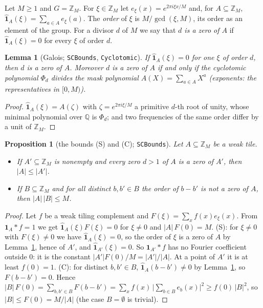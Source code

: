 \documentclass[11pt,a4paper]{amsart}
\newtheorem{proposition}[theorem]{Proposition}
\newtheorem{lemma}[theorem]{Lemma}
\theoremstyle{definition}
\theoremstyle{remark}
\newcommand{\Z}{\mathbb{Z}}
\newcommand{\Q}{\mathbb{Q}}
\newcommand{\one}{\mathbf{1}}
\newcommand{\lean}[1]{\texttt{#1}}
\begin{document}
Let $M\ge 1$ and $G=\Z_M$. For $\xi\in\Z_M$ let $e_\xi(x)=e^{2\pi i\xi x/M}$ and, for $A\subseteq\Z_M$,
$\hat{\one}_A(\xi)=\sum_{a\in A}e_\xi(a)$. The \emph{order} of $\xi$ is $M/\gcd(\xi,M)$, its order as an element
of the group. For a divisor $d$ of $M$ we say that \emph{$d$ is a zero of $A$} if $\hat{\one}_A(\xi)=0$ for
every $\xi$ of order $d$.

\begin{lemma}[Galois; \lean{SCBounds}, \lean{Cyclotomic}]\label{N:lem:gal}
If $\hat{\one}_A(\xi)=0$ for one $\xi$ of order $d$, then $d$ is a zero of $A$. Moreover $d$ is a zero of $A$ if
and only if the cyclotomic polynomial $\Phi_d$ divides the mask polynomial $A(X)=\sum_{a\in A}X^a$ (exponents: the
representatives in $[0,M)$).
\end{lemma}
\begin{proof}
$\hat{\one}_A(\xi)=A(\zeta)$ with $\zeta=e^{2\pi i\xi/M}$ a primitive $d$-th root of unity, whose minimal
polynomial over $\Q$ is $\Phi_d$; and two frequencies of the same order differ by a unit of $\Z_M$.
\end{proof}

\begin{proposition}[the bounds (S) and (C); \lean{SCBounds}]\label{N:prop:SC}
Let $A\subseteq\Z_M$ be a weak tile.
\begin{itemize}
\item[\textup{(S)}] If $A'\subseteq\Z_M$ is nonempty and every zero $d>1$ of $A$ is a zero of $A'$, then $|A|\le|A'|$.
\item[\textup{(C)}] If $B\subseteq\Z_M$ and for all distinct $b,b'\in B$ the order of $b-b'$ is not a zero of $A$, then
 $|A|\,|B|\le M$.
\end{itemize}
\end{proposition}
\begin{proof}
Let $f$ be a weak tiling complement and $F(\xi)=\sum_xf(x)e_\xi(x)$. From $\one_A*f=1$ we get
$\hat{\one}_A(\xi)F(\xi)=0$ for $\xi\ne0$ and $|A|\,F(0)=M$. (S): for $\xi\ne 0$ with $F(\xi)\ne0$ we have
$\hat{\one}_A(\xi)=0$, so the order of $\xi$ is a zero of $A$ by Lemma~\ref{N:lem:gal}, hence of $A'$, and
$\hat{\one}_{A'}(\xi)=0$. So $\one_{A'}*f$ has no Fourier coefficient outside $0$: it is the constant
$|A'|F(0)/M=|A'|/|A|$. At a point of $A'$ it is at least $f(0)=1$. (C): for distinct $b,b'\in B$,
$\hat{\one}_A(b-b')\ne0$ by Lemma~\ref{N:lem:gal}, so $F(b-b')=0$. Hence
$|B|\,F(0)=\sum_{b,b'\in B}F(b-b')=\sum_xf(x)\,\bigl|\sum_{b\in B}e_b(x)\bigr|^2\ge f(0)\,|B|^2$, so
$|B|\le F(0)=M/|A|$ (the case $B=\emptyset$ is trivial).
\end{proof}
\end{document}
